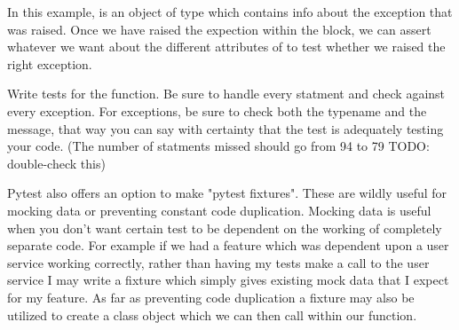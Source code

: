 In this example,  is an object of type  which contains info about the exception that was raised.  Once we have raised the expection within the  block, we can assert whatever we want about the different attributes of  to test whether we raised the right exception.

\begin{problem}
Write tests for the  function.  Be sure to handle every statment and check against every exception.
For exceptions, be sure to check both the typename and the message, that way you can say with certainty that the test is adequately testing your code.
(The number of statments missed should go from 94 to 79 TODO: double-check this)
\end{problem}

Pytest also offers an option to make "pytest fixtures". These are wildly useful for mocking data or preventing constant code duplication.
Mocking data is useful when you don't want certain test to be dependent on the working of completely separate code.
For example if we had a feature which was dependent upon a user service working correctly, rather than having my tests make a call to the user service I may write a fixture which simply gives existing mock data that I expect for my feature.
As far as preventing code duplication a fixture may also be utilized to create a class object which we can then call within our function.

